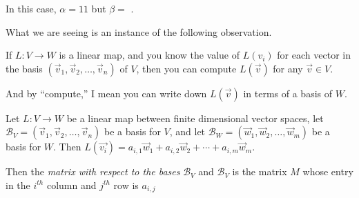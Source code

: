 \documentclass{ximera}
\begin{document}
\begin{question}
\begin{solution}
      In this case, $\alpha = 11$ but $\beta =$ .
    \end{solution}

    What we are seeing is an instance of the following observation.

    \begin{observation}
      If $L:V \to W$ is a linear map, and you know the value of $L(v_i)$ for each vector in the basis $(\vec{v}_1,\vec{v}_2,\ldots,\vec{v}_n)$ of $V$, 
      then you can compute $L(\vec{v})$ for any $\vec{v} \in V$.

      And by ``compute,'' I mean you can write down $L(\vec{v})$ in terms of a basis of $W$.
    \end{observation}

\end{question}

\begin{definition}
  Let $L:V \to W$ be a linear map between finite dimensional vector
  spaces, let $\mathcal{B}_V =(\vec{v}_1 ,\vec{v}_2,\ldots,\vec{v}_n) $
  be a basis for $V$, and let $\mathcal{B}_W =
  (\vec{w}_1,\vec{w}_2,\ldots,\vec{w}_m)$ be a basis for $W$.  Then
  $L(\vec{v_i}) = a_{i,1}\vec{w}_1+a_{i,2}\vec{w}_2 + \cdots +
  a_{i,m}\vec{w}_m$.

  Then the \textit{matrix with respect to the bases} $\mathcal{B}_V$
  and $\mathcal{B}_V$ is the matrix $M$ whose entry in the $i^{th}$
  column and $j^{th}$ row is $a_{i,j}$
\end{definition}
\end{document}

